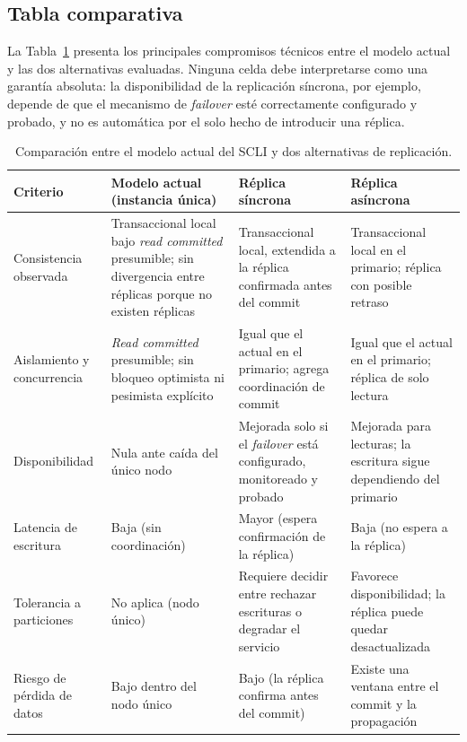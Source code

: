 \documentclass[conference]{IEEEtran}
\begin{document}
\subsection{Tabla comparativa}

La Tabla~\ref{tab:comparacion-modelos} presenta los principales compromisos t\'ecnicos entre el modelo actual y las dos alternativas evaluadas. Ninguna celda debe interpretarse como una garant\'ia absoluta: la disponibilidad de la replicaci\'on s\'incrona, por ejemplo, depende de que el mecanismo de \emph{failover} est\'e correctamente configurado y probado, y no es autom\'atica por el solo hecho de introducir una r\'eplica.

\begin{table}[!t]
\centering
\caption{Comparaci\'on entre el modelo actual del SCLI y dos alternativas de replicaci\'on.}
\label{tab:comparacion-modelos}
\small
\begin{tabularx}{\textwidth}{@{}l X X X@{}}
\toprule
\textbf{Criterio} & \textbf{Modelo actual (instancia \'unica)} & \textbf{R\'eplica s\'incrona} & \textbf{R\'eplica as\'incrona} \\
\midrule
Consistencia observada & Transaccional local bajo \emph{read committed} presumible; sin divergencia entre r\'eplicas porque no existen r\'eplicas & Transaccional local, extendida a la r\'eplica confirmada antes del commit & Transaccional local en el primario; r\'eplica con posible retraso \\
Aislamiento y concurrencia & \emph{Read committed} presumible; sin bloqueo optimista ni pesimista expl\'icito & Igual que el actual en el primario; agrega coordinaci\'on de commit & Igual que el actual en el primario; r\'eplica de solo lectura \\
Disponibilidad & Nula ante ca\'ida del \'unico nodo & Mejorada solo si el \emph{failover} est\'a configurado, monitoreado y probado & Mejorada para lecturas; la escritura sigue dependiendo del primario \\
Latencia de escritura & Baja (sin coordinaci\'on) & Mayor (espera confirmaci\'on de la r\'eplica) & Baja (no espera a la r\'eplica) \\
Tolerancia a particiones & No aplica (nodo \'unico) & Requiere decidir entre rechazar escrituras o degradar el servicio & Favorece disponibilidad; la r\'eplica puede quedar desactualizada \\
Riesgo de p\'erdida de datos & Bajo dentro del nodo \'unico & Bajo (la r\'eplica confirma antes del commit) & Existe una ventana entre el commit y la propagaci\'on \\

\end{tabularx}
\end{table}
\end{document}
